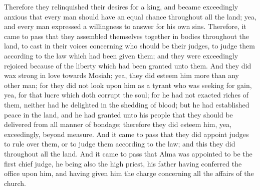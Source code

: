Therefore they relinquished their desires for a king, and became exceedingly anxious that every man should have an equal chance throughout all the land; yea, and every man expressed a willingness to answer for his own sins.
\bverse \iffalse Therefore, it came to pass that they assembled themselves together in bodies throughout the land, to cast in their voices concerning who should be their judges, to judge them according to the law which had been given them; and they were exceedingly rejoiced because of the liberty which had been granted unto them. \fi
Therefore, it came to pass that they assembled themselves together in bodies throughout the land, to cast in their voices concerning who should be their judges, to judge them according to the law which had been given them; and they were exceedingly rejoiced because of the liberty which had been granted unto them.
\bverse \iffalse And they did wax strong in love towards Mosiah; yea, they did esteem him more than any other man; for they did not look upon him as a tyrant who was seeking for gain, yea, for that lucre which doth corrupt the soul; for he had not exacted riches of them, neither had he delighted in the shedding of blood; but he had established peace in the land, and he had granted unto his people that they should be delivered from all manner of bondage; therefore they did esteem him, yea, exceedingly, beyond measure. \fi
And they did wax strong in love towards Mosiah; yea, they did esteem him more than any other man; for they did not look upon him as a tyrant who was seeking for gain, yea, for that lucre which doth corrupt the soul; for he had not exacted riches of them, neither had he delighted in the shedding of blood; but he had established peace in the land, and he had granted unto his people that they should be delivered from all manner of bondage; therefore they did esteem him, yea, exceedingly, beyond measure.
\bverse \iffalse And it came to pass that they did appoint judges to rule over them, or to judge them according to the law; and this they did throughout all the land. \fi
And it came to pass that they did appoint judges to rule over them, or to judge them according to the law; and this they did throughout all the land.
\bverse \iffalse And it came to pass that Alma was appointed to be the first chief judge, he being also the high priest, his father having conferred the office upon him, and having given him the charge concerning all the affairs of the church. \fi
And it came to pass that Alma was appointed to be the first chief judge, he being also the high priest, his father having conferred the office upon him, and having given him the charge concerning all the affairs of the church.
